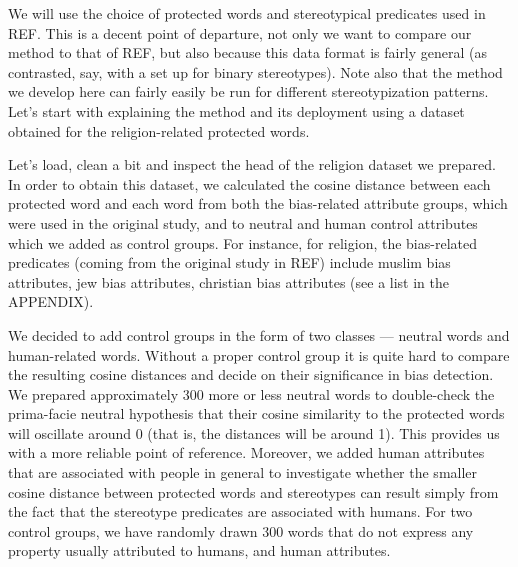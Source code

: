 \documentclass[12pt,]{book}
\begin{document}
\normalsize 

We will use the choice of protected words and stereotypical predicates
used in REF. This is a decent point of departure, not only we want to
compare our method to that of REF, but also because this data format is
fairly general (as contrasted, say, with a set up for binary
stereotypes). Note also that the method we develop here can fairly
easily be run for different stereotypization patterns. Let's start with
explaining the method and its deployment using a dataset obtained for
the religion-related protected words.

Let's load, clean a bit and inspect the head of the religion dataset we
prepared. In order to obtain this dataset, we calculated the cosine
distance between each protected word and each word from both the
bias-related attribute groups, which were used in the original study,
and to neutral and human control attributes which we added as control
groups. For instance, for religion, the bias-related predicates (coming
from the original study in REF) include muslim bias attributes, jew bias
attributes, christian bias attributes (see a list in the APPENDIX).

We decided to add control groups in the form of two classes --- neutral
words and human-related words. Without a proper control group it is
quite hard to compare the resulting cosine distances and decide on their
significance in bias detection. We prepared approximately
300 more or less neutral words to double-check the
prima-facie neutral hypothesis that their cosine similarity to the
protected words will oscillate around 0 (that is, the distances will be
around 1). This provides us with a more reliable point of reference.
Moreover, we added human attributes that are associated with people in
general to investigate whether the smaller cosine distance between
protected words and stereotypes can result simply from the fact that the
stereotype predicates are associated with humans. For two control
groups, we have randomly drawn 300 words that do not express any
property usually attributed to humans, and human attributes.

\vspace{1mm} \footnotesize
\end{document}
